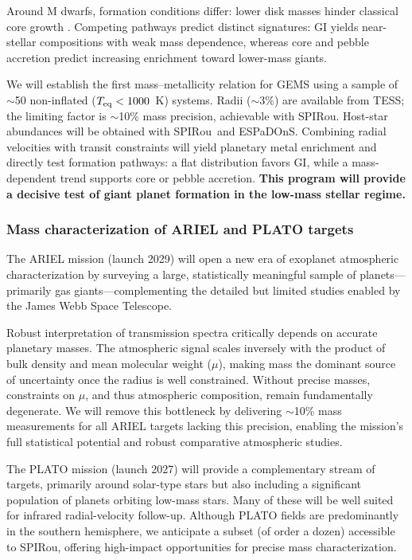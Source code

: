 \documentclass[
    traditabstract,
    longauth,
    onecolumn,
]{aa}
\def \spi{SPIRou}
\def \esp{ESPaDOnS}
\begin{document}
Around M dwarfs, formation conditions differ: lower disk masses hinder classical core growth \citep{Andrews2013, Miguel2020, Schlecker2022}. Competing pathways predict distinct signatures: GI yields near-stellar compositions with weak mass dependence, whereas core and pebble accretion predict increasing enrichment toward lower-mass giants.

We will establish the first mass--metallicity relation for GEMS using a sample of $\sim$50 non-inflated ($T_{\rm eq} < 1000$~K) systems. Radii ($\sim$3\%) are available from TESS; the limiting factor is $\sim$10\% mass precision, achievable with SPIRou. Host-star abundances will be obtained with \spi\ and \esp. Combining radial velocities with transit constraints will yield planetary metal enrichment and directly test formation pathways: a flat distribution favors GI, while a mass-dependent trend supports core or pebble accretion. {\bf This program will provide a decisive test of giant planet formation in the low-mass stellar regime.}

\subsubsection{Mass characterization of ARIEL and PLATO targets}

The ARIEL mission (launch 2029) will open a new era of exoplanet atmospheric characterization by surveying a large, statistically meaningful sample of planets---primarily gas giants---complementing the detailed but limited studies enabled by the James Webb Space Telescope.

Robust interpretation of transmission spectra critically depends on accurate planetary masses. The atmospheric signal scales inversely with the product of bulk density and mean molecular weight ($\mu$), making mass the dominant source of uncertainty once the radius is well constrained. Without precise masses, constraints on $\mu$, and thus atmospheric composition, remain fundamentally degenerate. We will remove this bottleneck by delivering $\sim$10\% mass measurements for all ARIEL targets lacking this precision, enabling the mission’s full statistical potential and robust comparative atmospheric studies.

The PLATO mission (launch 2027) will provide a complementary stream of targets, primarily around solar-type stars but also including a significant population of planets orbiting low-mass stars. Many of these will be well suited for infrared radial-velocity follow-up. Although PLATO fields are predominantly in the southern hemisphere, we anticipate a subset (of order a dozen) accessible to SPIRou, offering high-impact opportunities for precise mass characterization.
\end{document}
